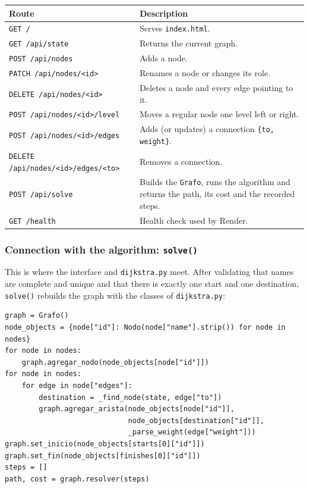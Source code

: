 \documentclass[11pt,letterpaper]{article}
\newcommand{\code}[1]{\texttt{#1}}
\begin{document}
\begin{tabularx}{\textwidth}{>{\raggedright\arraybackslash}p{6.3cm}L}
\toprule
\textbf{Route} & \textbf{Description} \\
\midrule
\code{GET /} & Serves \code{index.html}. \\
\code{GET /api/state} & Returns the current graph. \\
\code{POST /api/nodes} & Adds a node. \\
\code{PATCH /api/nodes/<id>} & Renames a node or changes its role. \\
\code{DELETE /api/nodes/<id>} & Deletes a node and every edge pointing to it. \\
\code{POST /api/nodes/<id>/level} & Moves a regular node one level left or right. \\
\code{POST /api/nodes/<id>/edges} & Adds (or updates) a connection \code{\{to, weight\}}. \\
\code{DELETE /api/nodes/<id>/edges/<to>} & Removes a connection. \\
\code{POST /api/solve} & Builds the \code{Grafo}, runs the algorithm and returns the path, its cost and the recorded steps. \\
\code{GET /health} & Health check used by Render. \\
\bottomrule
\end{tabularx}

\subsubsection*{Connection with the algorithm: \code{solve()}}

This is where the interface and \code{dijkstra.py} meet. After validating
that names are complete and unique and that there is exactly one start and
one destination, \code{solve()} rebuilds the graph with the classes of
\code{dijkstra.py}:

\begin{lstlisting}
graph = Grafo()
node_objects = {node["id"]: Nodo(node["name"].strip()) for node in nodes}
for node in nodes:
    graph.agregar_nodo(node_objects[node["id"]])
for node in nodes:
    for edge in node["edges"]:
        destination = _find_node(state, edge["to"])
        graph.agregar_arista(node_objects[node["id"]],
                             node_objects[destination["id"]],
                             _parse_weight(edge["weight"]))
graph.set_inicio(node_objects[starts[0]["id"]])
graph.set_fin(node_objects[finishes[0]["id"]])
steps = []
path, cost = graph.resolver(steps)
\end{lstlisting}
\end{document}
